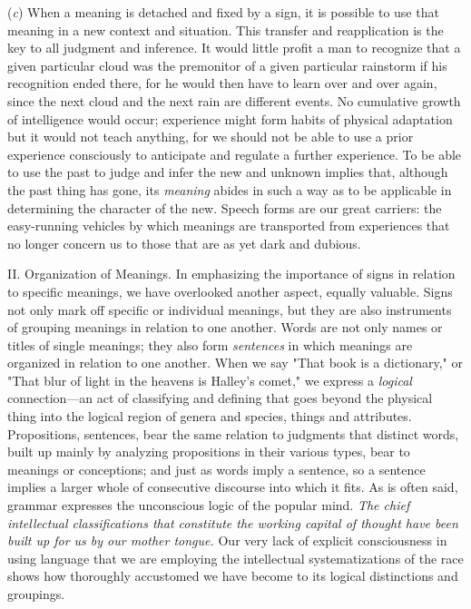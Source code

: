 \documentclass[letterpaper]{book}
\begin{document}

(\emph{c}) When a meaning is detached and fixed by a sign, it is
possible to use that meaning in a new context and situation. This
transfer and reapplication is the key to all judgment and inference. It
would little profit a man to recognize that a given particular cloud was
the premonitor of a given particular rainstorm if his recognition ended
there, for he would then have to learn over and over again, since the
next cloud and the next rain are different events. No cumulative growth
of intelligence would occur; experience might form habits of physical
adaptation but it would not teach anything, for we should not be able to
use a prior experience consciously to anticipate and regulate a further
experience. To be able to
use
the past to judge and infer the new and unknown implies that, although
the past thing has gone, its \emph{meaning} abides in such a way as to
be applicable in determining the character of the new. Speech forms are
our great carriers: the easy-running vehicles by which meanings are
transported from experiences that no longer concern us to those that are
as yet dark and dubious.


II. Organization of Meanings. In emphasizing the importance of signs in
relation to specific meanings, we have overlooked another aspect,
equally valuable. Signs not only mark off specific or individual
meanings, but they are also instruments of grouping meanings in relation
to one another. Words are not only names or titles of single meanings;
they also form \emph{sentences} in which meanings are organized in
relation to one another. When we say "That book is a dictionary," or
"That blur of light in the heavens is Halley's comet," we express a
\emph{logical} connection---an act of classifying and defining that goes
beyond the physical thing into the logical region of genera and species,
things and attributes. Propositions, sentences, bear the same relation
to judgments that distinct words, built up mainly by analyzing
propositions in their various types, bear to meanings or conceptions;
and just as words imply a sentence, so a sentence implies a larger whole
of consecutive discourse into which it fits. As is often said, grammar
expresses the unconscious logic of the popular mind. \emph{The chief
intellectual classifications that constitute the working capital of
thought have been built up for us by our mother tongue.} Our very lack
of explicit consciousness in using language that we are employing the
intellectual systematizations of the race shows how thoroughly
accustomed we have become to its logical distinctions and
groupings.
\end{document}
